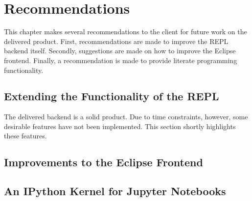 \chapter{Recommendations} \label{cha:recommendations}

This chapter makes several recommendations to the client for future work on the
delivered product. First, recommendations are made to improve the REPL backend
itself. Secondly, suggestions are made on how to improve the Eclipse frontend.
Finally, a recommendation is made to provide literate programming functionality.

\section{Extending the Functionality of the REPL}
\label{sec:impr-backend}

The delivered backend is a solid product. Due to time constraints, however, some
desirable features have not been implemented. This section shortly highlights
these features.





\section{Improvements to the Eclipse Frontend}
\label{sec:impr-eclipse}



\section{An IPython Kernel for Jupyter Notebooks}
\label{sec:discuss-literate-programming}



